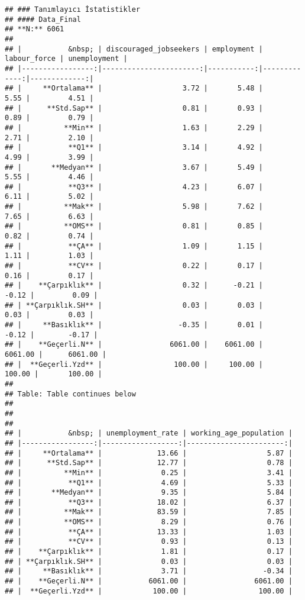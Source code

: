 \documentclass[
]{article}
\begin{document}
\begin{verbatim}
## ### Tanımlayıcı İstatistikler  
## #### Data_Final  
## **N:** 6061  
## 
## |           &nbsp; | discouraged_jobseekers | employment | labour_force | unemployment |
## |-----------------:|-----------------------:|-----------:|-------------:|-------------:|
## |     **Ortalama** |                   3.72 |       5.48 |         5.55 |         4.51 |
## |      **Std.Sap** |                   0.81 |       0.93 |         0.89 |         0.79 |
## |          **Min** |                   1.63 |       2.29 |         2.71 |         2.10 |
## |           **Q1** |                   3.14 |       4.92 |         4.99 |         3.99 |
## |       **Medyan** |                   3.67 |       5.49 |         5.55 |         4.46 |
## |           **Q3** |                   4.23 |       6.07 |         6.11 |         5.02 |
## |          **Mak** |                   5.98 |       7.62 |         7.65 |         6.63 |
## |          **OMS** |                   0.81 |       0.85 |         0.82 |         0.74 |
## |           **ÇA** |                   1.09 |       1.15 |         1.11 |         1.03 |
## |           **CV** |                   0.22 |       0.17 |         0.16 |         0.17 |
## |    **Çarpıklık** |                   0.32 |      -0.21 |        -0.12 |         0.09 |
## | **Çarpıklık.SH** |                   0.03 |       0.03 |         0.03 |         0.03 |
## |     **Basıklık** |                  -0.35 |       0.01 |        -0.12 |        -0.17 |
## |    **Geçerli.N** |                6061.00 |    6061.00 |      6061.00 |      6061.00 |
## |  **Geçerli.Yzd** |                 100.00 |     100.00 |       100.00 |       100.00 |
## 
## Table: Table continues below
## 
##  
## 
## |           &nbsp; | unemployment_rate | working_age_population |
## |-----------------:|------------------:|-----------------------:|
## |     **Ortalama** |             13.66 |                   5.87 |
## |      **Std.Sap** |             12.77 |                   0.78 |
## |          **Min** |              0.25 |                   3.41 |
## |           **Q1** |              4.69 |                   5.33 |
## |       **Medyan** |              9.35 |                   5.84 |
## |           **Q3** |             18.02 |                   6.37 |
## |          **Mak** |             83.59 |                   7.85 |
## |          **OMS** |              8.29 |                   0.76 |
## |           **ÇA** |             13.33 |                   1.03 |
## |           **CV** |              0.93 |                   0.13 |
## |    **Çarpıklık** |              1.81 |                   0.17 |
## | **Çarpıklık.SH** |              0.03 |                   0.03 |
## |     **Basıklık** |              3.71 |                  -0.34 |
## |    **Geçerli.N** |           6061.00 |                6061.00 |
## |  **Geçerli.Yzd** |            100.00 |                 100.00 |
\end{verbatim}
\end{document}
